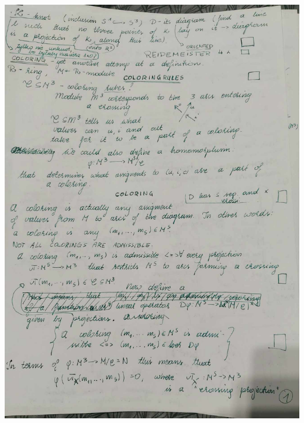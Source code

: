 \documentclass{article}
\begin{document}
\pagestyle{empty}

\includegraphics[width=\textwidth]{01.jpg}
\end{document}
